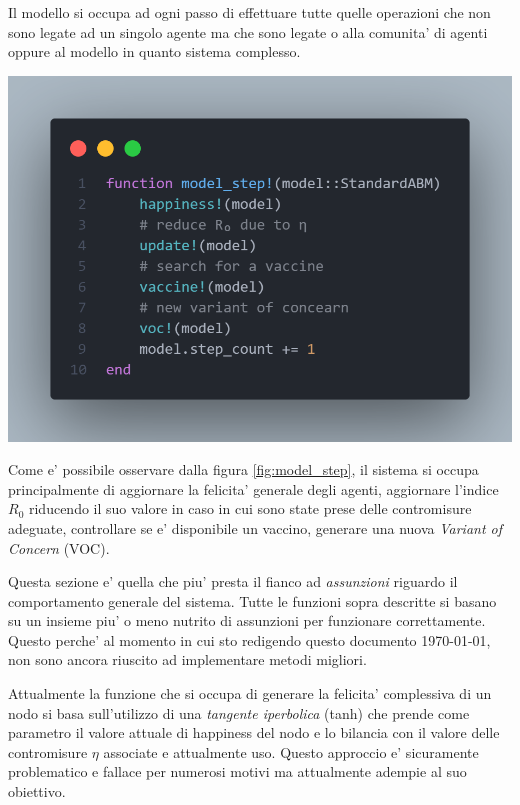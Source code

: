 Il modello si occupa ad ogni passo di effettuare tutte quelle operazioni che non sono legate ad un
singolo agente ma che sono legate o alla comunita' di agenti oppure al modello in quanto sistema complesso. 

\begin{minipage}{\linewidth}
	\centering
	\includegraphics[width=\textwidth]{img/model_step.png}
	\label{fig:model_step}
\end{minipage}

Come e' possibile osservare dalla figura \ref{fig:model_step}, il sistema si occupa principalmente
di aggiornare la felicita' generale degli agenti, aggiornare l'indice $R_0$ riducendo il suo valore 
in caso in cui sono state prese delle contromisure adeguate, controllare se e' disponibile un vaccino,
generare una nuova \emph{Variant of Concern} (VOC). 

Questa sezione e' quella che piu' presta il fianco ad \emph{assunzioni} riguardo 
il comportamento generale del sistema. Tutte le funzioni sopra descritte si basano su un insieme
piu' o meno nutrito di assunzioni per funzionare correttamente. Questo perche' al momento in cui sto 
redigendo questo documento \today, non sono ancora riuscito ad implementare metodi migliori.

Attualmente la funzione che si occupa di generare la felicita' complessiva di un nodo si basa
sull'utilizzo di una \emph{tangente iperbolica} (tanh) che prende come parametro il valore attuale
di happiness del nodo e lo bilancia con il valore delle contromisure $\eta$ associate e attualmente 
uso. Questo approccio e' sicuramente problematico e fallace per numerosi motivi ma attualmente 
adempie al suo obiettivo. 


